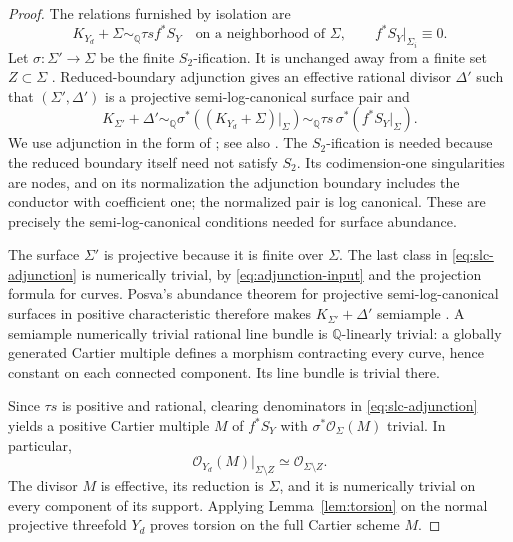 \begin{proof}
The relations furnished by isolation are
\begin{equation}\label{eq:adjunction-input}
 K_{Y_d}+\Sigma\sim_{\mathbb Q}\tau s f^*S_Y
       \quad\text{on a neighborhood of }\Sigma,
 \qquad f^*S_Y|_{\Sigma_i}\equiv0.
\end{equation}
Let $\sigma:\Sigma'\to\Sigma$ be the finite $S_2$-ification.  It is
unchanged away from a finite set $Z\subset\Sigma$
\cite[Proposition~2.14]{XuNuTwo}.  Reduced-boundary adjunction gives
an effective rational divisor $\Delta'$ such that $(\Sigma',\Delta')$
is a projective semi-log-canonical surface pair and
\begin{equation}\label{eq:slc-adjunction}
 K_{\Sigma'}+\Delta'
       \sim_{\mathbb Q}\sigma^*((K_{Y_d}+\Sigma)|_\Sigma)
       \sim_{\mathbb Q}\tau s\,\sigma^*(f^*S_Y|_\Sigma).
\end{equation}
We use adjunction in the form of
\cite[Lemma~2.19]{XuNuTwo}; see also
\cite[Section~2.5]{Companion}.  The $S_2$-ification is needed because
the reduced boundary itself need not satisfy $S_2$.  Its
codimension-one singularities are nodes, and on its normalization the
adjunction boundary includes the conductor with coefficient one;
the normalized pair is log canonical.  These are precisely the
semi-log-canonical conditions needed for surface abundance.

The surface $\Sigma'$ is projective because it is finite over $\Sigma$.
The last class in \eqref{eq:slc-adjunction} is numerically trivial,
by \eqref{eq:adjunction-input} and the projection formula for curves.
Posva's abundance theorem for projective semi-log-canonical surfaces
in positive characteristic therefore makes
$K_{\Sigma'}+\Delta'$ semiample
\cite[Theorem~3.1]{Posva}.  A semiample numerically trivial rational
line bundle is $\mathbb Q$-linearly trivial: a globally generated Cartier
multiple defines a morphism contracting every curve, hence constant
on each connected component.  Its line bundle is trivial there.

Since $\tau s$ is positive and rational, clearing denominators in
\eqref{eq:slc-adjunction} yields a positive Cartier multiple $M$ of
$f^*S_Y$ with $\sigma^*\mathcal O_\Sigma(M)$ trivial.  In particular,
\[
 \mathcal O_{Y_d}(M)|_{\Sigma\setminus Z}
        \simeq\mathcal O_{\Sigma\setminus Z}.
\]
The divisor $M$ is effective, its reduction is $\Sigma$, and it is
numerically trivial on every component of its support.  Applying
Lemma~\ref{lem:torsion} on the normal projective threefold $Y_d$ proves
torsion on the full Cartier scheme $M$.
\end{proof}

